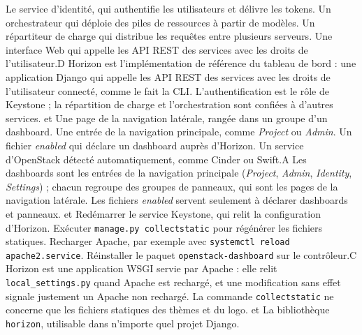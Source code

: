   {Le service d'identité, qui authentifie les utilisateurs et délivre les tokens.}
  {Un orchestrateur qui déploie des piles de ressources à partir de modèles.}
  {Un répartiteur de charge qui distribue les requêtes entre plusieurs serveurs.}
  {Une interface Web qui appelle les API REST des services avec les droits de l'utilisateur.}{D}
  {Horizon est l'implémentation de référence du tableau de bord : une application Django qui appelle les API REST des services avec les droits de l'utilisateur connecté, comme le fait la CLI. L'authentification est le rôle de Keystone ; la répartition de charge et l'orchestration sont confiées à d'autres services.}
  { et }
  {Une page de la navigation latérale, rangée dans un groupe d'un dashboard.}
  {Une entrée de la navigation principale, comme \emph{Project} ou \emph{Admin}.}
  {Un fichier \emph{enabled} qui déclare un dashboard auprès d'Horizon.}
  {Un service d'OpenStack détecté automatiquement, comme Cinder ou Swift.}{A}
  {Les dashboards sont les entrées de la navigation principale (\emph{Project}, \emph{Admin}, \emph{Identity}, \emph{Settings}) ; chacun regroupe des groupes de panneaux, qui sont les pages de la navigation latérale. Les fichiers \emph{enabled} servent seulement à déclarer dashboards et panneaux.}
  { et }
  {Redémarrer le service Keystone, qui relit la configuration d'Horizon.}
  {Exécuter \texttt{manage.py collectstatic} pour régénérer les fichiers statiques.}
  {Recharger Apache, par exemple avec \texttt{systemctl reload apache2.service}.}
  {Réinstaller le paquet \texttt{openstack-dashboard} sur le contrôleur.}{C}
  {Horizon est une application WSGI servie par Apache : elle relit \texttt{local\_settings.py} quand Apache est rechargé, et une modification sans effet signale justement un Apache non rechargé. La commande \texttt{collectstatic} ne concerne que les fichiers statiques des thèmes et du logo.}
  { et }
  {La bibliothèque \texttt{horizon}, utilisable dans n'importe quel projet Django.}
